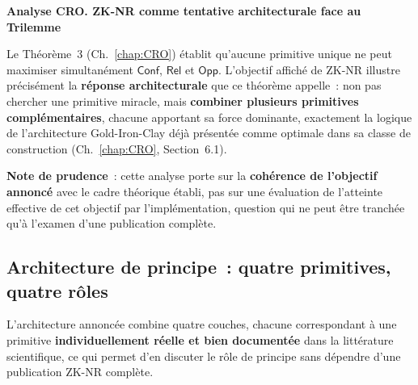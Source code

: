 \begin{boxCRO}
\textbf{Analyse CRO. ZK-NR comme tentative architecturale face
au Trilemme}

Le Théorème~3 (Ch.~\ref{chap:CRO}) établit qu'aucune primitive
unique ne peut maximiser simultanément $\mathsf{Conf}$,
$\mathsf{Rel}$ et $\mathsf{Opp}$. L'objectif affiché de ZK-NR
illustre précisément la \textbf{réponse architecturale} que ce
théorème appelle~: non pas chercher une primitive miracle, mais
\textbf{combiner plusieurs primitives complémentaires}, chacune
apportant sa force dominante, exactement la logique de
l'architecture Gold-Iron-Clay déjà présentée comme optimale dans
sa classe de construction (Ch.~\ref{chap:CRO}, Section~6.1).


\textbf{Note de prudence}~: cette analyse porte sur la
\textbf{cohérence de l'objectif annoncé} avec le cadre théorique
établi, pas sur une évaluation de l'atteinte effective de cet
objectif par l'implémentation, question qui ne peut être
tranchée qu'à l'examen d'une publication complète.
\end{boxCRO}

\subsection{Architecture de principe~: quatre primitives, quatre rôles}

L'architecture annoncée combine quatre couches, chacune correspondant
à une primitive \textbf{individuellement réelle et bien documentée}
dans la littérature scientifique, ce qui permet d'en discuter
le rôle de principe sans dépendre d'une publication ZK-NR complète.

